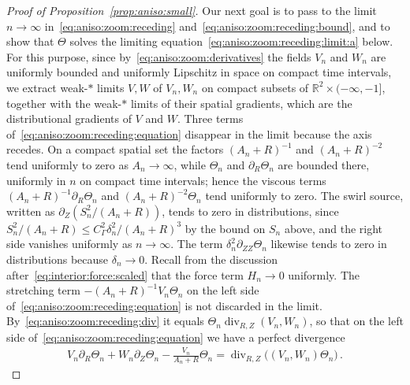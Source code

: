 \documentclass[11pt,reqno]{amsproc}
\numberwithin{equation}{section}
\theoremstyle{remark}
\newcommand{\p}{\partial}
\newcommand{\RR}{\mathbb R}
\renewcommand{\div}{\operatorname{div}}
\begin{document}
\begin{proof}[Proof of Proposition~\ref{prop:aniso:small}]
Our next goal is to pass to the limit $n\to\infty$ in~\eqref{eq:aniso:zoom:receding} and~\eqref{eq:aniso:zoom:receding:bound}, and to show that $\Theta$ solves the limiting equation~\eqref{eq:aniso:zoom:receding:limit:a} below. For this purpose, since by~\eqref{eq:aniso:zoom:derivatives} the fields $V_n$ and $W_n$ are uniformly bounded and uniformly Lipschitz in space on compact time intervals, we extract weak-$*$ limits $V,W$ of $V_n,W_n$ on compact subsets of $\RR^2\times(-\infty,-1]$, together with the weak-$*$ limits of their spatial gradients, which are the distributional gradients of $V$ and $W$.
Three terms of~\eqref{eq:aniso:zoom:receding:equation} disappear in the limit because the axis recedes. On a compact spatial set the factors $(A_n+R)^{-1}$ and $(A_n+R)^{-2}$ tend uniformly to zero as $A_n\to\infty$, while $\Theta_n$ and $\p_R\Theta_n$ are bounded there, uniformly in $n$ on compact time intervals; hence the viscous terms $(A_n+R)^{-1}\p_R\Theta_n$ and $(A_n+R)^{-2}\Theta_n$ tend uniformly to zero. The swirl source, written as $\p_Z(S_n^2/(A_n+R))$, tends to zero in distributions, since $S_n^2/(A_n+R)\le C_\Gamma^2\delta_n^2/(A_n+R)^3$ by the bound on $S_n$ above, and the right side vanishes uniformly as $n\to\infty$.
The term $\delta_n^2\p_{ZZ}\Theta_n$ likewise tends to zero in distributions because $\delta_n\to0$. Recall from the discussion after~\eqref{eq:interior:force:scaled} that the force term $H_n\to0$ uniformly. The stretching term $-(A_n+R)^{-1}V_n\Theta_n$ on the left side of~\eqref{eq:aniso:zoom:receding:equation} is not discarded in the limit. By~\eqref{eq:aniso:zoom:receding:div} it equals $\Theta_n\div_{R,Z}(V_n,W_n)$, so that on the left side of~\eqref{eq:aniso:zoom:receding:equation} we have a perfect divergence
\begin{align*}
V_n\p_R\Theta_n+W_n\p_Z\Theta_n-\frac{V_n}{A_n+R}\Theta_n
=\div_{R,Z}\bigl((V_n,W_n)\Theta_n\bigr)
\,.
\end{align*}


\end{proof}
\end{document}
